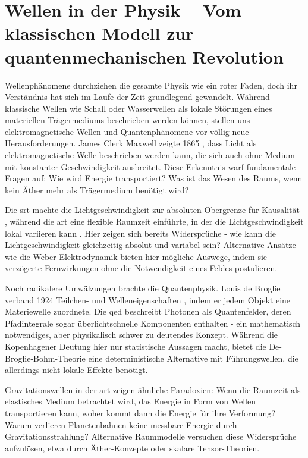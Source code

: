 \section{Wellen in der Physik – Vom klassischen Modell zur quantenmechanischen Revolution}
Wellenphänomene durchziehen die gesamte Physik wie ein roter Faden, doch ihr Verständnis hat sich im Laufe der Zeit grundlegend gewandelt. Während klassische Wellen wie Schall
oder Wasserwellen als lokale Störungen eines materiellen Trägermediums beschrieben werden können, stellen uns elektromagnetische Wellen und Quantenphänomene vor völlig neue
Herausforderungen. James Clerk Maxwell zeigte 1865 \cite{Maxwell1865}, dass Licht als elektromagnetische Welle beschrieben werden kann, die sich auch ohne Medium mit konstanter
Geschwindigkeit ausbreitet. Diese Erkenntnis warf fundamentale Fragen auf: Wie wird Energie transportiert? Was ist das Wesen des Raums, wenn kein Äther mehr als Trägermedium benötigt wird?

Die \gls{srt} machte die Lichtgeschwindigkeit zur absoluten Obergrenze für Kausalität \cite{Einstein1905}, während die \gls{art} eine flexible Raumzeit einführte, in der die
Lichtgeschwindigkeit lokal variieren kann \cite{MisnerThorneWheeler1973}. Hier zeigen sich bereits Widersprüche - wie kann die Lichtgeschwindigkeit gleichzeitig absolut und variabel sein?
Alternative Ansätze wie die Weber-Elektrodynamik \cite{Weber1846, WeberElectrodynamics} bieten hier mögliche Auswege, indem sie verzögerte Fernwirkungen ohne die Notwendigkeit eines
Feldes postulieren.

Noch radikalere Umwälzungen brachte die Quantenphysik. Louis de Broglie verband 1924 Teilchen- und Welleneigenschaften \cite{deBroglie1924}, indem er jedem Objekt eine Materiewelle zuordnete.
Die \gls{qed} beschreibt Photonen als Quantenfelder, deren Pfadintegrale sogar überlichtschnelle Komponenten enthalten \cite{FeynmanQED} - ein mathematisch notwendiges,
aber physikalisch schwer zu deutendes Konzept. Während die Kopenhagener Deutung hier nur statistische Aussagen macht, bietet die De-Broglie-Bohm-Theorie \cite{bohm1952} eine deterministische
Alternative mit Führungswellen, die allerdings nicht-lokale Effekte benötigt.

Gravitationswellen \cite{LIGO2016} in der \gls{art} zeigen ähnliche Paradoxien: Wenn die Raumzeit als elastisches Medium betrachtet wird, das Energie in Form von Wellen transportieren kann, woher kommt
dann die Energie für ihre Verformung? Warum verlieren Planetenbahnen keine messbare Energie durch Gravitationsstrahlung? Alternative Raummodelle versuchen diese Widersprüche aufzulösen,
etwa durch Äther-Konzepte oder skalare Tensor-Theorien.

